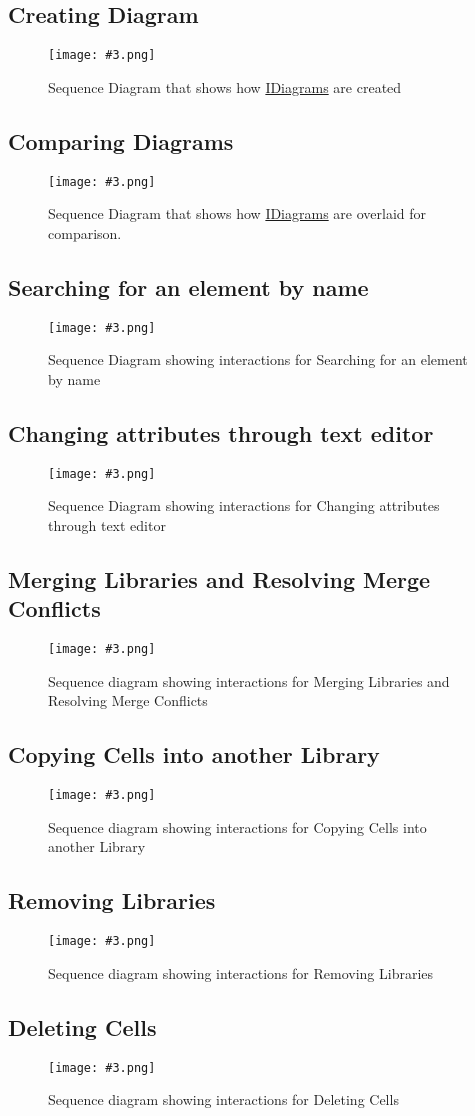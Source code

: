 \documentclass[10pt,a4paper]{report}
\newcommand{\refer}[2]{\hyperref[#1]{\textcolor{col:reference}{#2}}}
\newcommand{\includeimage}[5]{
    \begin{figure}[H]
        #1
        \texttt{[image: \#3.png]}
        \caption{#4}
        \label{fig:#5}
    \end{figure}
}
\newcommand{\packagebeginning}{edu.kit.informatik.pse.gelf} %
\newcommand{\lblroot}{lbl} %
\newcommand{\lblpackage}{} %
\newcommand{\lblpackageelement}{} %
\newcommand{\lblpackageelementmember}{} %
\newcommand{\lblpackageelementmemberparameter}{} %
\newcommand{\casclabelname}{\lblroot\lblpackage\lblpackageelement\lblpackageelementmember\lblpackageelementmemberparameter}
\newcommand{\casclabel}{\label{\casclabelname}}
\begin{document}
\subsection{Creating Diagram}
\includeimage{}{0.32}{DiagramCreation}{Sequence Diagram that shows how \refer{\lblroot:view.diagrams:IDiagram}{IDiagrams} are created}{Creating Diagram}
\subsection{Comparing Diagrams}
\includeimage{}{0.32}{DiagramComparison}{Sequence Diagram that shows how \refer{\lblroot:view.diagrams:IDiagram}{IDiagrams} are overlaid for comparison.}{Comparing Diagrams}
\subsection{Searching for an element by name}
\includeimage{}{0.42}{FR-9}{Sequence Diagram showing interactions for Searching for an element by name}{FR-9}
\subsection{Changing attributes through text editor}
\includeimage{}{0.35}{FR10}{Sequence Diagram showing interactions for Changing attributes through text editor}{FR-10}
\subsection{Merging Libraries and Resolving Merge Conflicts}
\includeimage{}{0.19}{FR-12,13}{Sequence diagram showing interactions for Merging Libraries and Resolving Merge Conflicts}{FR-12 and FR-13}
\subsection{Copying Cells into another Library}
\includeimage{}{0.27}{FR-14}{Sequence diagram showing interactions for Copying Cells into another Library}{Copying Cells into another Library}
\subsection{Removing Libraries}
\includeimage{}{0.30}{removinglibraries}{Sequence diagram showing interactions for Removing Libraries}{Removing Libraries}
\subsection{Deleting Cells}
\includeimage{}{0.24}{deletingcell}{Sequence diagram showing interactions for Deleting Cells}{Deleting Cells}
\end{document}
